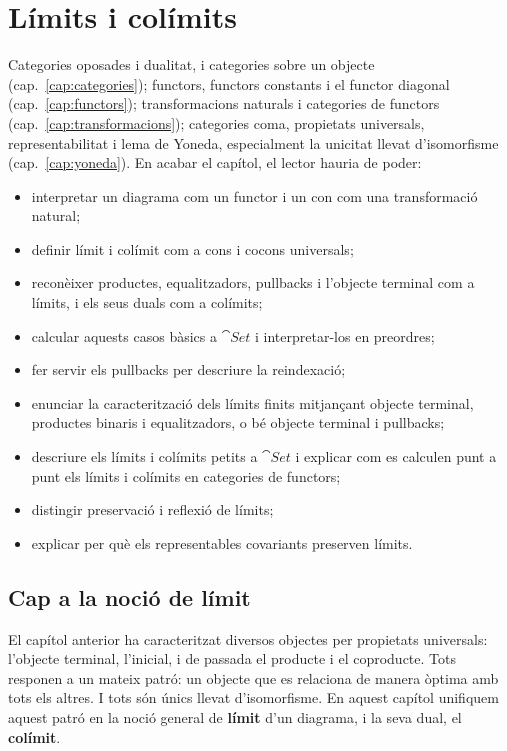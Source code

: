 \chapter[Límits i colímits]{Límits i colímits}
\label{cap:limits}

\begin{objectius}
 Categories oposades i dualitat, i categories sobre un objecte (cap.~\ref{cap:categories}); functors, functors constants i el functor diagonal (cap.~\ref{cap:functors}); transformacions naturals i categories de functors (cap.~\ref{cap:transformacions}); categories coma, propietats universals, representabilitat i lema de Yoneda, especialment la unicitat llevat d'isomorfisme (cap.~\ref{cap:yoneda}).
 En acabar el capítol, el lector hauria de poder:
\begin{itemize}
  \item interpretar un diagrama com un functor i un con com una transformació natural;
  \item definir límit i colímit com a cons i cocons universals;
  \item reconèixer productes, equalitzadors, pullbacks i l'objecte terminal com a límits, i els seus duals com a colímits;
  \item calcular aquests casos bàsics a $\cat{Set}$ i interpretar-los en preordres;
  \item fer servir els pullbacks per descriure la reindexació;
  \item enunciar la caracterització dels límits finits mitjançant objecte terminal, productes binaris i equalitzadors, o bé objecte terminal i pullbacks;
  \item descriure els límits i colímits petits a $\cat{Set}$ i explicar com es calculen punt a punt els límits i colímits en categories de functors;
  \item distingir preservació i reflexió de límits;
  \item explicar per què els representables covariants preserven límits.
\end{itemize}
\end{objectius}

\section{Cap a la noció de límit}

El capítol anterior ha caracteritzat diversos objectes per propietats universals: l'objecte terminal, l'inicial, i de passada el producte i el coproducte. Tots responen a un mateix patró: un objecte que es relaciona de manera òptima amb tots els altres. I tots són únics llevat d'isomorfisme. En aquest capítol unifiquem aquest patró en la noció general de \textbf{límit} d'un diagrama, i la seva dual, el \textbf{colímit}.

